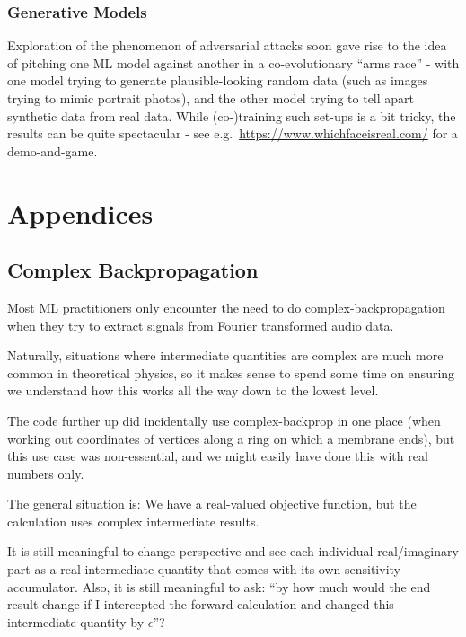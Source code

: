 \documentclass[11pt]{article}
\begin{document}
\hypertarget{generative-models}{%
\subsubsection{Generative Models}\label{generative-models}}

Exploration of the phenomenon of adversarial attacks soon gave rise to
the idea of pitching one ML model against another in a co-evolutionary
``arms race'' - with one model trying to generate plausible-looking
random data (such as images trying to mimic portrait photos), and the
other model trying to tell apart synthetic data from real data. While
(co-)training such set-ups is a bit tricky, the results can be quite
spectacular - see e.g.~\url{https://www.whichfaceisreal.com/} for a
demo-and-game.

    \hypertarget{appendices}{%
\section{Appendices}\label{appendices}}

    \hypertarget{complex-backpropagation}{%
\subsection{Complex Backpropagation}\label{complex-backpropagation}}

Most ML practitioners only encounter the need to do
complex-backpropagation when they try to extract signals from Fourier
transformed audio data.

Naturally, situations where intermediate quantities are complex are much
more common in theoretical physics, so it makes sense to spend some time
on ensuring we understand how this works all the way down to the lowest
level.

The code further up did incidentally use complex-backprop in one place
(when working out coordinates of vertices along a ring on which a
membrane ends), but this use case was non-essential, and we might easily
have done this with real numbers only.

The general situation is: We have a real-valued objective function, but
the calculation uses complex intermediate results.

It is still meaningful to change perspective and see each individual
real/imaginary part as a real intermediate quantity that comes with its
own sensitivity-accumulator. Also, it is still meaningful to ask: ``by
how much would the end result change if I intercepted the forward
calculation and changed this intermediate quantity by \(\epsilon\)''?
\end{document}

